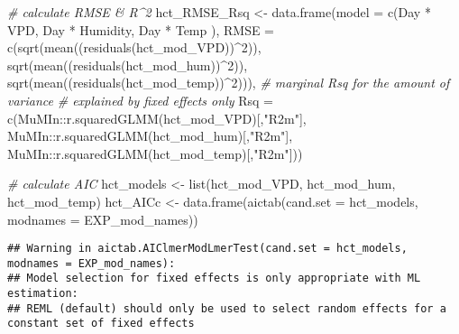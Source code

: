 \documentclass[
]{article}
\newenvironment{Shaded}{\begin{snugshade}}{\end{snugshade}}
\newcommand{\AttributeTok}[1]{\textcolor[rgb]{0.77,0.63,0.00}{#1}}
\newcommand{\CommentTok}[1]{\textcolor[rgb]{0.56,0.35,0.01}{\textit{#1}}}
\newcommand{\DecValTok}[1]{\textcolor[rgb]{0.00,0.00,0.81}{#1}}
\newcommand{\FunctionTok}[1]{\textcolor[rgb]{0.00,0.00,0.00}{#1}}
\newcommand{\NormalTok}[1]{#1}
\newcommand{\OtherTok}[1]{\textcolor[rgb]{0.56,0.35,0.01}{#1}}
\newcommand{\SpecialCharTok}[1]{\textcolor[rgb]{0.00,0.00,0.00}{#1}}
\newcommand{\StringTok}[1]{\textcolor[rgb]{0.31,0.60,0.02}{#1}}
\begin{document}
\begin{Shaded}
\begin{Highlighting}[]
\CommentTok{\# calculate RMSE \& R\^{}2}
\NormalTok{hct\_RMSE\_Rsq }\OtherTok{\textless{}{-}} \FunctionTok{data.frame}\NormalTok{(}\AttributeTok{model =} 
                               \FunctionTok{c}\NormalTok{(}\StringTok{\textquotesingle{}Day * VPD\textquotesingle{}}\NormalTok{,}
                                 \StringTok{\textquotesingle{}Day * Humidity\textquotesingle{}}\NormalTok{,}
                                 \StringTok{\textquotesingle{}Day * Temp\textquotesingle{}}
\NormalTok{                                 ),}
                           \AttributeTok{RMSE =} \FunctionTok{c}\NormalTok{(}\FunctionTok{sqrt}\NormalTok{(}\FunctionTok{mean}\NormalTok{((}\FunctionTok{residuals}\NormalTok{(hct\_mod\_VPD))}\SpecialCharTok{\^{}}\DecValTok{2}\NormalTok{)),}
                                    \FunctionTok{sqrt}\NormalTok{(}\FunctionTok{mean}\NormalTok{((}\FunctionTok{residuals}\NormalTok{(hct\_mod\_hum))}\SpecialCharTok{\^{}}\DecValTok{2}\NormalTok{)),}
                                    \FunctionTok{sqrt}\NormalTok{(}\FunctionTok{mean}\NormalTok{((}\FunctionTok{residuals}\NormalTok{(hct\_mod\_temp))}\SpecialCharTok{\^{}}\DecValTok{2}\NormalTok{))),}
                           \CommentTok{\# marginal Rsq for the amount of variance}
                           \CommentTok{\# explained by fixed effects only}
                           \AttributeTok{Rsq =} \FunctionTok{c}\NormalTok{(MuMIn}\SpecialCharTok{::}\FunctionTok{r.squaredGLMM}\NormalTok{(hct\_mod\_VPD)[,}\StringTok{"R2m"}\NormalTok{],}
\NormalTok{                                   MuMIn}\SpecialCharTok{::}\FunctionTok{r.squaredGLMM}\NormalTok{(hct\_mod\_hum)[,}\StringTok{"R2m"}\NormalTok{],}
\NormalTok{                                   MuMIn}\SpecialCharTok{::}\FunctionTok{r.squaredGLMM}\NormalTok{(hct\_mod\_temp)[,}\StringTok{"R2m"}\NormalTok{]))}

\CommentTok{\# calculate AIC}
\NormalTok{hct\_models }\OtherTok{\textless{}{-}} \FunctionTok{list}\NormalTok{(hct\_mod\_VPD, hct\_mod\_hum, hct\_mod\_temp)}
\NormalTok{hct\_AICc }\OtherTok{\textless{}{-}} \FunctionTok{data.frame}\NormalTok{(}\FunctionTok{aictab}\NormalTok{(}\AttributeTok{cand.set =}\NormalTok{ hct\_models, }
                                 \AttributeTok{modnames =}\NormalTok{ EXP\_mod\_names))}
\end{Highlighting}
\end{Shaded}

\begin{verbatim}
## Warning in aictab.AIClmerModLmerTest(cand.set = hct_models, modnames = EXP_mod_names): 
## Model selection for fixed effects is only appropriate with ML estimation:
## REML (default) should only be used to select random effects for a constant set of fixed effects
\end{verbatim}
\end{document}
